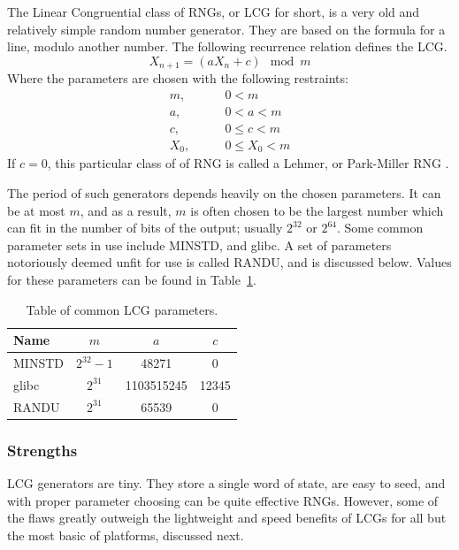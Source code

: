 The Linear Congruential class of RNGs, or LCG for short, is a very old and relatively simple random number generator. They are based on the formula for a line, modulo another number. The following recurrence relation defines the LCG.
\begin{equation} \label{eq:lcg}
    X_{n+1} = (aX_n + c) \mod m
\end{equation}
Where the parameters are chosen with the following restraints:
\begin{align*}
    m,   \qquad & 0 < m \\
    a,   \qquad & 0 < a < m \\
    c,   \qquad & 0 \leq c < m \\
    X_0, \qquad & 0 \leq X_0 < m
\end{align*}
If $c = 0$, this particular class of of RNG is called a Lehmer, or Park-Miller RNG \cite{Payne:1969:CLP:362848.362860,Park:1988:RNG:63039.63042}.

The period of such generators depends heavily on the chosen parameters. It can be at most $m$, and as a result, $m$ is often chosen to be the largest number which can fit in the number of bits of the output; usually $2^{32}$ or $2^{64}$. Some common parameter sets in use include MINSTD, and glibc. A set of parameters notoriously deemed unfit for use is called RANDU, and is discussed below. Values for these parameters can be found in Table~\ref{tab:lcg_params}.

\begin{table}[tb]
    \caption{Table of common LCG parameters.}
    \label{tab:lcg_params}
    \begin{center}
        \begin{tabular}{l|ccc}
        \hline
        \hline
        \textbf{Name} & $m$ & $a$ & $c$ \\
        \hline
            MINSTD & $2^{32} - 1$ & 48271 & 0 \\
            glibc & $2^{31}$ & 1103515245 & 12345 \\
            RANDU & $2^{31}$ & 65539 & 0 \\
        \hline
        \hline
        \end{tabular}
    \end{center}
\end{table}

\subsubsection{Strengths}
LCG generators are tiny. They store a single word of state, are easy to seed, and with proper parameter choosing can be quite effective RNGs. However, some of the flaws greatly outweigh the lightweight and speed benefits of LCGs for all but the most basic of platforms, discussed next.

